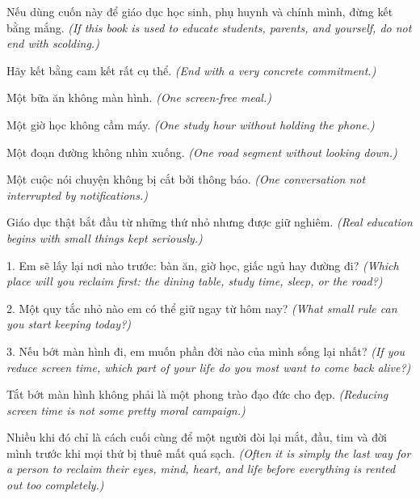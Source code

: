 \begin{goigiaovien}
Nếu dùng cuốn này để giáo dục học sinh, phụ huynh và chính mình, đừng kết bằng mắng.
\textit{(If this book is used to educate students, parents, and yourself, do not end with scolding.)}

Hãy kết bằng cam kết rất cụ thể.
\textit{(End with a very concrete commitment.)}

Một bữa ăn không màn hình.
\textit{(One screen-free meal.)}

Một giờ học không cầm máy.
\textit{(One study hour without holding the phone.)}

Một đoạn đường không nhìn xuống.
\textit{(One road segment without looking down.)}

Một cuộc nói chuyện không bị cắt bởi thông báo.
\textit{(One conversation not interrupted by notifications.)}

Giáo dục thật bắt đầu từ những thứ nhỏ nhưng được giữ nghiêm.
\textit{(Real education begins with small things kept seriously.)}
\end{goigiaovien}

\begin{tuhocnhanh}
1. Em sẽ lấy lại nơi nào trước: bàn ăn, giờ học, giấc ngủ hay đường đi? \textit{(Which place will you reclaim first: the dining table, study time, sleep, or the road?)}

2. Một quy tắc nhỏ nào em có thể giữ ngay từ hôm nay? \textit{(What small rule can you start keeping today?)}

3. Nếu bớt màn hình đi, em muốn phần đời nào của mình sống lại nhất? \textit{(If you reduce screen time, which part of your life do you most want to come back alive?)}
\end{tuhocnhanh}

\begin{tongketchuong}
Tắt bớt màn hình không phải là một phong trào đạo đức cho đẹp.
\textit{(Reducing screen time is not some pretty moral campaign.)}

Nhiều khi đó chỉ là cách cuối cùng để một người đòi lại mắt, đầu, tim và đời mình trước khi mọi thứ bị thuê mất quá sạch.
\textit{(Often it is simply the last way for a person to reclaim their eyes, mind, heart, and life before everything is rented out too completely.)}
\end{tongketchuong}

\ngancach